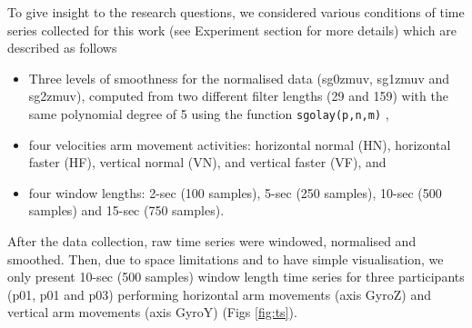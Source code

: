 \documentclass[fleqn,10pt]{wlscirep}
\begin{document}
To give insight to the research questions, 
we considered various conditions of time series collected for this work 
(see Experiment section for more details) which are described as follows
\begin{itemize}
\item Three levels of smoothness for the normalised data 
	(sg0zmuv, sg1zmuv and sg2zmuv), computed from two different filter 
	lengths (29 and 159) with the same polynomial degree 
	of 5 using the function \texttt{sgolay(p,n,m)} \cite{Rsignal},
\item four velocities arm movement activities: 
	horizontal normal (HN), horizontal faster (HF), 
	vertical normal (VN), and vertical faster (VF), and
\item four window lengths: 2-sec (100 samples), 5-sec (250 samples), 
	10-sec (500 samples) and 15-sec (750 samples).
\end{itemize}
After the data collection, raw time series were windowed, normalised and 
smoothed. Then, due to space limitations and to have simple visualisation, 
we only present 10-sec (500 samples) window length time series for 
three participants (p01, p01 and p03) performing horizontal 
arm movements (axis GyroZ) and vertical arm movements (axis GyroY) (Figs \ref{fig:ts}). 
\end{document}
